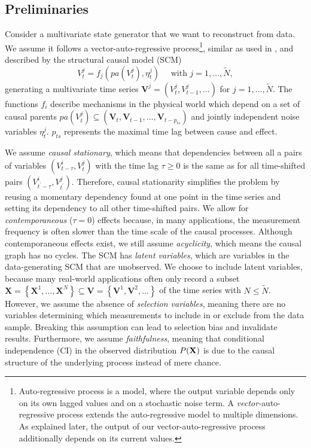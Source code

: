 \documentclass[conference]{IEEEtran}
\begin{document}
\subsection{Preliminaries}
Consider a multivariate state generator that we want to reconstruct from data.
We assume it follows a vector-auto-regressive process\footnote{Auto-regressive process is a model, where the output variable depends only on its own lagged values and on a stochastic noise term. A \textit{vector-}auto-regressive process extends the auto-regressive model to multiple dimensions. As explained later, the output of our vector-auto-regressive process additionally depends on its current values.}, similar as used in \cite{gerhardus_high-recall_2021}, and described by the structural causal model (SCM)
\begin{equation}
V_{t}^{j}=f_{j}\left(pa\left(V_{t}^{j}\right), \eta_{t}^{j}\right) \quad \text { with } j=1, \ldots, \tilde{N},
\end{equation}
generating a multivariate time series $\mathbf{V}^{j}=\left(V_{t}^{j}, V_{t-1}^{j}, \ldots\right)$ for $j=1, \ldots, \tilde{N}$.
The functions $f_i$ describe mechanisms in the physical world which depend on a set of causal parents $p a\left(V_{t}^{j}\right) \subseteq\left(\mathbf{V}_{t}, \mathbf{V}_{t-1}, \ldots, \mathbf{V}_{t-p_{t s}}\right)$ and jointly independent noise variables $\eta_{t}^{j}$. $p_{t s}$ represents the maximal time lag between cause and effect.

We assume \textit{causal stationary}, which means that dependencies between all a pairs of variables $\left(V_{t-\tau}^{i}, V_{t^{}}^{j}\right)$ with the time lag $\tau \geq 0$ is the same as for all time-shifted pairs $\left(V_{t^{\prime}-\tau}^{i}, V_{t^{\prime}}^{j}\right)$\cite{runge_causal_2018}. Therefore, causal stationarity simplifies the problem by reusing a momentary dependency found at one point in the time series and setting its dependency to all other time-shifted pairs.
We allow for \textit{contemporaneous} ($\tau=0$) effects because, in many applications, the measurement frequency is often slower than the time scale of the causal processes. Although contemporaneous effects exist, we still assume \textit{acyclicity}, which means the causal graph has no cycles.
The SCM has \textit{latent variables}, which are variables in the data-generating SCM that are unobserved. We choose to include latent variables, because many real-world applications often only record a subset $\mathbf{X}=\left\{\mathbf{X}^{1}, \ldots, \mathbf{X}^{N}\right\} \subseteq \mathbf{V}=\left\{\mathbf{V}^{1}, \mathbf{V}^{2}, \ldots\right\}$ of the time series with $N \leq \tilde{N}$. 
However, we assume the absence of \textit{selection variables}, meaning there are no variables determining which measurements to include in or exclude from the data sample. Breaking this assumption can lead to selection bias and invalidate results.
Furthermore, we assume \textit{faithfulness}, meaning that conditional independence (CI) in the observed distribution $P(\bf{X})$ is due to the causal structure of the underlying process instead of mere chance\cite{gerhardus_high-recall_2021}.
\end{document}
